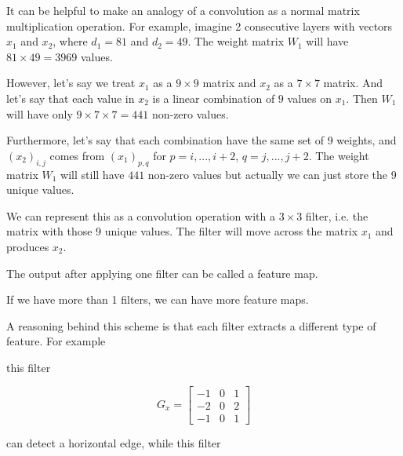\documentclass[12pt]{article}
\begin{document}
It can be helpful to 
make an analogy of
a convolution as a normal matrix multiplication operation.
For example, imagine 2 consecutive layers with vectors $x_1$ and $x_2$, where $d_1 = 81$ and $d_2 = 49$. The weight matrix $W_1$ will have $81 \times 49 = 3969$ values.

However, let's say we treat $x_1$ as a $9 \times 9$ matrix and $x_2$ as a $7 \times 7$ matrix. And let's say that each value in $x_2$ is a linear combination of $9$ values on $x_1$. Then $W_1$ will have only $9 \times 7 \times 7 = 441$ non-zero values.

Furthermore, let's say that each combination have the same set of 9 weights, and $(x_2)_{i,j}$ comes from $(x_1)_{p,q}$ for $p = i, ..., i+2$, $q = j, ..., j+2$. The weight matrix $W_1$ will still have $441$ non-zero values but actually we can just store the 9 unique values.

We can represent this as a convolution operation with a $3 \times 3$ filter, i.e. the matrix with those 9 unique values. The filter will move across the matrix $x_1$ and produces $x_2$. 

The output after applying one filter can be called a feature map.

If we have more than 1 filters, we can have more feature maps.

A reasoning behind this scheme is that each filter extracts a different type of feature. For example




this filter 

\[
G_x = \begin{bmatrix}
-1 & 0 & 1 \\
-2 & 0 & 2 \\
-1 & 0 & 1
\end{bmatrix}
\]

can detect a horizontal edge, while this filter

\end{document}
